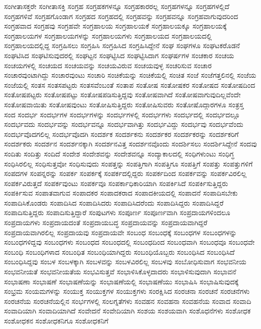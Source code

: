 {ಸಂಗೀತಾಸಕ್ತರೇ
ಸಂಗೀತಾಸಕ್ತಿ
ಸಂಗ್ರಹ
ಸಂಗ್ರಹಕಗಳನ್ನೂ
ಸಂಗ್ರಹಕಾರರಲ್ಲ
ಸಂಗ್ರಹಗಳನ್ನೂ
ಸಂಗ್ರಹಗಳಲ್ಲಿದೆ
ಸಂಗ್ರಹಗಳಿವೆ
ಸಂಗ್ರಹಗೊಂಡಾಗ
ಸಂಗ್ರಹದ
ಸಂಗ್ರಹದಲ್ಲಿ
ಸಂಗ್ರಹವನ್ನು
ಸಂಗ್ರಹವನ್ನೂ
ಸಂಗ್ರಹವಾಗುವುದರಿಂದ
ಸಂಗ್ರಹವಾದ
ಸಂಗ್ರಹವು
ಸಂಗ್ರಹವೇ
ಸಂಗ್ರಹಾಲಯ
ಸಂಗ್ರಹಾಲಯಕೆ
ಸಂಗ್ರಹಾಲಯಕ್ಕೂ
ಸಂಗ್ರಹಾಲಯಕ್ಕೆ
ಸಂಗ್ರಹಾಲಯಗಳ
ಸಂಗ್ರಹಾಲಯಗಳನ್ನು
ಸಂಗ್ರಹಾಲಯಗಳು
ಸಂಗ್ರಹಾಲಯದ
ಸಂಗ್ರಹಾಲಯದಲ್ಲಿ
ಸಂಗ್ರಹಾಲಯದಲ್ಲಿದ್ದ
ಸಂಗ್ರಹಿಸಲು
ಸಂಗ್ರಹಿಸಿ
ಸಂಗ್ರಹಿಸಿದ
ಸಂಗ್ರಹಿಸಿದ್ದೇನೆ
ಸಂಘ
ಸಂಘಗಳೂ
ಸಂಘಟಕರೊಡನೆ
ಸಂಘಟಿಸಿದ
ಸಂಘಟಿಸುವುದರಲ್ಲಿ
ಸಂಘಟ್ಟನ
ಸಂಘಟ್ಟಿಸಿದ
ಸಂಘಟ್ಟಿಸಿದಾಗ
ಸಂಘರ್ಷಗಳ
ಸಂಚಕಾರ
ಸಂಚಯ
ಸಂಚಯಗಳಲ್ಲಿ
ಸಂಚಯದ
ಸಂಚಯವನ್ನು
ಸಂಚಯವಿರುವ
ಸಂಚಯವುಳ್ಳ
ಸಂಚರಿಸುವ
ಸಂಚಾರ
ಸಂಚಾರವುಂಟಾಗಿದ್ದು
ಸಂಚಾರವುಂಟು
ಸಂಚಾರಿ
ಸಂಚಿಕೆಯನ್ನು
ಸಂಚಿಕೆಯಲ್ಲಿ
ಸಂಚಿತ
ಸಂಜೆ
ಸಂಜೆಗತ್ತಲಿನಲ್ಲಿ
ಸಂಜೆಯ
ಸಂಜೆಯಲ್ಲಿ
ಸಂತಸ
ಸಂತಸಪಟ್ಟರು
ಸಂತಸವೆಂಬಂತೆ
ಸಂತಾಪ
ಸಂತೋಷ
ಸಂತೋಷಕರ
ಸಂತೋಷದ
ಸಂತೋಷದಿಂದ
ಸಂತೋಷಪಟ್ಟರು
ಸಂತೋಷಪಟ್ಟು
ಸಂತೋಷಪಡಿಸುತ್ತಿದ್ದವು
ಸಂತೋಷವಾಗಿದೆ
ಸಂತೋಷವಾಗುವುದಿಲ್ಲವೆಂದೇ
ಸಂತೋಷವಾಯಿತು
ಸಂತೋಷವುಂಟು
ಸಂತೋಷಿಸುತ್ತಿದ್ದರು
ಸಂತೋಷಿಸುವರು
ಸಂತೋಷೊದ್ಗಾರಗಳೂ
ಸಂತ್ರಸ್ತ
ಸಂದ
ಸಂದರ್ಭ
ಸಂದರ್ಭಗಳ
ಸಂದರ್ಭಗಳನ್ನು
ಸಂದರ್ಭಗಳಲ್ಲಿ
ಸಂದರ್ಭಗಳು
ಸಂದರ್ಭದಲ್ಲಿ
ಸಂದರ್ಭದಲ್ಲೂ
ಸಂದರ್ಭವದು
ಸಂದರ್ಭವನ್ನು
ಸಂದರ್ಭವನ್ನೂ
ಸಂದರ್ಭವಾಗಿತ್ತು
ಸಂದರ್ಭವಿದ್ದು
ಸಂದರ್ಭವು
ಸಂದರ್ಭವೆಂದು
ಸಂದರ್ಭವೊದಗಲಿಲ್ಲ
ಸಂದರ್ಭವೊದಗಿ
ಸಂದರ್ಶಕ
ಸಂದರ್ಶಕನು
ಸಂದರ್ಶಕರ
ಸಂದರ್ಶಕರನ್ನು
ಸಂದರ್ಶಕರಿಗೆ
ಸಂದರ್ಶಕರು
ಸಂದರ್ಶನ
ಸಂದರ್ಶನಕ್ಕಾಗಿ
ಸಂದರ್ಶನವಿತ್ತ
ಸಂದರ್ಶನವೊಂದು
ಸಂದರ್ಶಿಸಲು
ಸಂದರ್ಶಿಸಿದ್ದೇನೆ
ಸಂದವು
ಸಂದಿತು
ಸಂದಿತ್ತು
ಸಂದಿದೆ
ಸಂದೇಶ
ಸಂದೇಶವನ್ನು
ಸಂದೇಶವನ್ನೂ
ಸಂದ್ಯಾಕಾಲದಲ್ಲಿ
ಸಂಧಿಗಳುಂಟು
ಸಂಧಿಗ್ಧ
ಸಂಧಿಸಿರಲಿಲ್ಲ
ಸಂಧಿಸುತ್ತವೋ
ಸಂಧಿಸುವುದು
ಸಂಪತ್ತನ್ನು
ಸಂಪತ್ತಿಗಾಗಿ
ಸಂಪತ್ತಿಗೂ
ಸಂಪತ್ತಿಗೆ
ಸಂಪತ್ತು
ಸಂಪತ್ತುಗಳಿಗೆ
ಸಂಪದಗಳ
ಸಂಪನ್ನರನ್ನು
ಸಂಪರ್ಕ
ಸಂಪರ್ಕಕ್ಕೆ
ಸಂಪರ್ಕದಲ್ಲಿದ್ದರು
ಸಂಪರ್ಕದಿಂದ
ಸಂಪರ್ಕವನ್ನು
ಸಂಪರ್ಕವಿರಲಿಲ್ಲ
ಸಂಪರ್ಕವಿರುತ್ತದೆ
ಸಂಪರ್ಕವುಂಟು
ಸಂಪರ್ಕವೂ
ಸಂಪರ್ಕಾಧಿಕಾರಿಯಾಗಿ
ಸಂಪರ್ಕಿಸಿದೆ
ಸಂಪರ್ಕಿಸುತ್ತಿದ್ದರು
ಸಂಪರ್ಕಿಸುವ
ಸಂಪಾತವಾಗುವ
ಸಂಪಾದಕರ
ಸಂಪಾದಕರಾದ
ಸಂಪಾದಕೀಯದಲ್ಲಿ
ಸಂಪಾದನೆ
ಸಂಪಾದಿಸಬೇಕು
ಸಂಪಾದಿಸಿಕೊಂಡರು
ಸಂಪಾದಿಸಿದ
ಸಂಪಾದಿಸಿದರು
ಸಂಪಾದಿಸಿದರೆಂದು
ಸಂಪಾದಿಸಿದ್ದರು
ಸಂಪಾದಿಸಿದ್ದರೆ
ಸಂಪಾದಿಸುತ್ತಿದ್ದರು
ಸಂಪಾದಿಸುತ್ತಿದ್ದಾರೆ
ಸಂಪುಟಗಳು
ಸಂಪೂರ್ಣ
ಸಂಪೂರ್ಣವಾಗಿ
ಸಂಪ್ರದಾಯಗಳಿಂದಲೂ
ಸಂಪ್ರದಾಯಗಳು
ಸಂಪ್ರದಾಯದಂತೆ
ಸಂಪ್ರದಾಯಬದ್ಧ
ಸಂಪ್ರದಾಯವನ್ನು
ಸಂಪ್ರದಾಯವಾಗಿದ್ದರೆ
ಸಂಪ್ರದಾಯವಾಗಿರಲಿಲ್ಲ
ಸಂಪ್ರದಾಯವು
ಸಂಪ್ರದಾಯವೇ
ಸಂಬಂಧ
ಸಂಬಂಧಕ್ಕೆ
ಸಂಬಂಧಗಳ
ಸಂಬಂಧಗಳನ್ನು
ಸಂಬಂಧಗಳಿದ್ದವು
ಸಂಬಂಧಗಳು
ಸಂಬಂಧದ
ಸಂಬಂಧದಲ್ಲಿ
ಸಂಬಂಧದಿಂದ
ಸಂಬಂಧವಾಗಿ
ಸಂಬಂಧವೂ
ಸಂಬಂಧವೇ
ಸಂಬಂಧಿ
ಸಂಬಂಧಿಗಳಾದ
ಸಂಬಂಧಿತ
ಸಂಬಂಧಿಯಾಗಿದ್ದರು
ಸಂಬಂಧಿಯೊಬ್ಬರು
ಸಂಬಂಧಿಸಿದ
ಸಂಬಂಧಿಸಿದೆ
ಸಂಬಂಧಿಸಿದ್ದವು
ಸಂಬಳ
ಸಂಬಳಕ್ಕಾಗಿ
ಸಂಬಳವನ್ನು
ಸಂಬಳವಿರಲಿಲ್ಲ
ಸಂಬಳವು
ಸಂಬೋಧಿಸುವಾಗ
ಸಂಭವನೀಯ
ಸಂಭವನೀಯತೆ
ಸಂಭವನೀಯತೆಯ
ಸಂಭವಿಸುತ್ತವೆ
ಸಂಭಾಳಿಸಿಕೊಳ್ಳದಾದರು
ಸಂಭಾಳಿಸುವುದಾಗಿ
ಸಂಭಾವನೆ
ಸಂಭಾಷಣಾ
ಸಂಭಾಷಣೆ
ಸಂಭಾಷಣೆಯನ್ನು
ಸಂಭಾಷಣೆಯಲ್ಲಿ
ಸಂಭಾಷಣೆಯು
ಸಂಭಾಷಿಸಿ
ಸಂಭಾಷಿಸುವುದಕ್ಕೆ
ಸಂಭ್ರಮ
ಸಂಯಮಗಳನ್ನು
ಸಂಯುಕ್ತ
ಸಂಯುಕ್ತಗಳ
ಸಂಯುಕ್ತಗಳು
ಸಂರಕ್ಷಿಸಿದ
ಸಂರಚನಾ
ಸಂರಚನೆ
ಸಂರಚನೆಗಳು
ಸಂರಚನೆಯ
ಸಂರಚನೆಯಲ್ಲಿನ
ಸಂರ್ಭಗಳಲ್ಲಿ
ಸಂಲಗ್ನತೆಗಳು
ಸಂವಹನ
ಸಂವಹನಾ
ಸಂವಹನೆಯ
ಸಂವಾದ
ಸಂವಾದಿ
ಸಂವಾದಿಯಾಗಿ
ಸಂವಾದಿಯಾಗಿದೆ
ಸಂವೇದನೆ
ಸಂವೇದಿಯಾಗಿ
ಸಂಶಯ
ಸಂಶಯವಾಗಿ
ಸಂಶೊಧನೆಗಳು
ಸಂಶೋಧಕ
ಸಂಶೋಧಕನ
ಸಂಶೋಧಕನಿಗೂ
ಸಂಶೋಧಕನಿಗೆ
}
